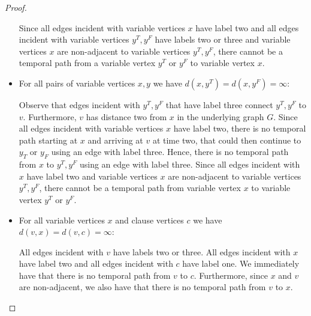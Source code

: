 \documentclass[11pt,a4paper]{article}
\theoremstyle{remark}
\theoremstyle{definition}
\begin{document}
\begin{proof}
\begin{itemize}
Since all edges incident with variable vertices $x$ have label two and all edges incident with variable vertices $y^T, y^F$ have labels two or three and variable vertices $x$ are non-adjacent to variable vertices $y^T,y^F$, there cannot be a temporal path from a variable vertex $y^T$ or $y^F$ to variable vertex $x$.
\item For all pairs of variable vertices $x,y$ we have $d(x,y^T)=d(x,y^F)=\infty$:

Observe that edges incident with $y^T, y^F$ that have label three connect $y^T, y^F$ to $v$. Furthermore, $v$ has distance two from $x$ in the underlying graph $G$. Since all edges incident with variable vertices $x$ have label two, there is no temporal path starting at $x$ and arriving at $v$ at time two, that could then continue to $y_T$ or $y_F$ using an edge with label three. Hence, there is no temporal path from $x$ to $y^T, y^F$ using an edge with label three. Since all edges incident with $x$ have label two and variable vertices $x$ are non-adjacent to variable vertices $y^T,y^F$, there cannot be a temporal path from variable vertex $x$ to variable vertex $y^T$ or $y^F$.
\item For all variable vertices $x$ and clause vertices $c$ we have $d(v,x)=d(v,c)=\infty$:

All edges incident with $v$ have labels two or three. All edges incident with $x$ have label two and all edges incident with $c$ have label one. We immediately have that there is no temporal path from $v$ to $c$. Furthermore, since $x$ and $v$ are non-adjacent, we also have that there is no temporal path from $v$ to $x$.
\end{itemize}
\end{proof}
\end{document}
